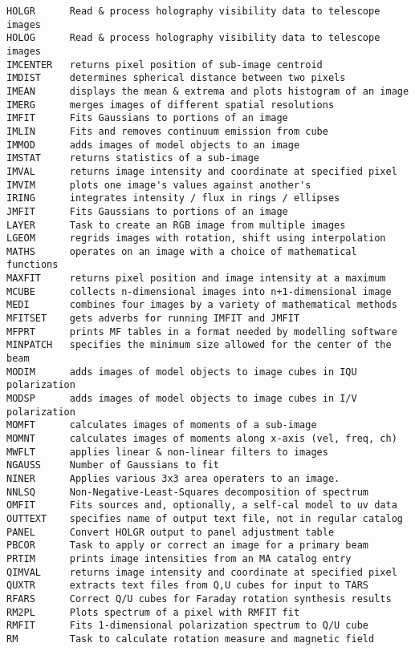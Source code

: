 \begin{verbatim}
HOLGR      Read & process holography visibility data to telescope images
HOLOG      Read & process holography visibility data to telescope images
IMCENTER   returns pixel position of sub-image centroid
IMDIST     determines spherical distance between two pixels
IMEAN      displays the mean & extrema and plots histogram of an image
IMERG      merges images of different spatial resolutions
IMFIT      Fits Gaussians to portions of an image
IMLIN      Fits and removes continuum emission from cube
IMMOD      adds images of model objects to an image
IMSTAT     returns statistics of a sub-image
IMVAL      returns image intensity and coordinate at specified pixel
IMVIM      plots one image's values against another's
IRING      integrates intensity / flux in rings / ellipses
JMFIT      Fits Gaussians to portions of an image
LAYER      Task to create an RGB image from multiple images
LGEOM      regrids images with rotation, shift using interpolation
MATHS      operates on an image with a choice of mathematical functions
MAXFIT     returns pixel position and image intensity at a maximum
MCUBE      collects n-dimensional images into n+1-dimensional image
MEDI       combines four images by a variety of mathematical methods
MFITSET    gets adverbs for running IMFIT and JMFIT
MFPRT      prints MF tables in a format needed by modelling software
MINPATCH   specifies the minimum size allowed for the center of the beam
MODIM      adds images of model objects to image cubes in IQU polarization
MODSP      adds images of model objects to image cubes in I/V polarization
MOMFT      calculates images of moments of a sub-image
MOMNT      calculates images of moments along x-axis (vel, freq, ch)
MWFLT      applies linear & non-linear filters to images
NGAUSS     Number of Gaussians to fit
NINER      Applies various 3x3 area operaters to an image.
NNLSQ      Non-Negative-Least-Squares decomposition of spectrum
OMFIT      Fits sources and, optionally, a self-cal model to uv data
OUTTEXT    specifies name of output text file, not in regular catalog
PANEL      Convert HOLGR output to panel adjustment table
PBCOR      Task to apply or correct an image for a primary beam
PRTIM      prints image intensities from an MA catalog entry
QIMVAL     returns image intensity and coordinate at specified pixel
QUXTR      extracts text files from Q,U cubes for input to TARS
RFARS      Correct Q/U cubes for Faraday rotation synthesis results
RM2PL      Plots spectrum of a pixel with RMFIT fit
RMFIT      Fits 1-dimensional polarization spectrum to Q/U cube
RM         Task to calculate rotation measure and magnetic field

\end{verbatim}
